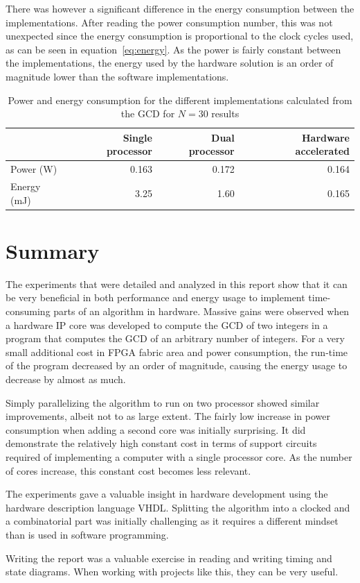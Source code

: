\documentclass[11pt]{article}
\begin{document}
There was however a significant difference in the energy consumption between the implementations. After reading the power consumption number, this was not unexpected since the energy consumption is proportional to the clock cycles used, as can be seen in equation~\eqref{eq:energy}. As the power is fairly constant between the implementations, the energy used by the hardware solution is an order of magnitude lower than the software implementations.

\begin{table}[htbp]
  \centering
  \begin{tabular}{lrrr}
    \toprule
    & Single processor  & Dual processor    & Hardware accelerated\\
    \midrule
    Power (W)   & 0.163         & 0.172         & 0.164\\

    Energy (mJ) & 3.25       & 1.60     & 0.165\\
    \bottomrule
  \end{tabular}
  \caption{Power and energy consumption for the different implementations calculated from the GCD for $N=30$ results}
  \label{tab:Power}
\end{table}

\section{Summary\label{sec:summary}}
The experiments that were detailed and analyzed in this report show that it can be very beneficial in both performance and energy usage to implement time-consuming parts of an algorithm in hardware. Massive gains were observed when a hardware IP core was developed to compute the GCD of two integers in a program that computes the GCD of an arbitrary number of integers. For a very small additional cost in FPGA fabric area and power consumption, the run-time of the program decreased by an order of magnitude, causing the energy usage to decrease by almost as much.

Simply parallelizing the algorithm to run on two processor showed similar improvements, albeit not to as large extent. The fairly low increase in power consumption when adding a second core was initially surprising. It did demonstrate the relatively high constant cost in terms of support circuits required of implementing a computer with a single processor core. As the number of cores increase, this constant cost becomes less relevant.

The experiments gave a valuable insight in hardware development using the hardware description language VHDL. Splitting the algorithm into a clocked and a combinatorial part was initially challenging as it requires a different mindset than is used in software programming.

Writing the report was a valuable exercise in reading and writing timing and state diagrams. When working with projects like this, they can be very useful.
\end{document}
